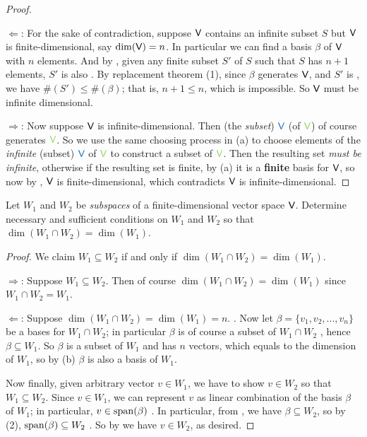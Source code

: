 \begin{proof} \ 

\(\Longleftarrow\): For the sake of contradiction, suppose \(\textsf{V}\) contains an infinite \LID{} subset \(S\) but \(\textsf{V}\) is finite-dimensional, say \(\dim(\textsf{V}) = n\).
In particular we can find a basis \(\beta\) of \(\textsf{V}\) with \(n\) elements.
And by , given any finite subset \(S'\) of \(S\) such that \(S\) has \(n + 1\) elements, \(S'\) is also \LID{}.
By replacement theorem (1), since \(\beta\) generates \(\textsf{V}\), and \(S'\) is \LID{}, we have \(\#(S') \le \#(\beta)\);
that is, \(n + 1 \le n\), which is impossible.
So \(\textsf{V}\) must be infinite dimensional.

\(\Longrightarrow\):
Now suppose \(\textsf{V}\) is infinite-dimensional.
Then (the \emph{subset}) \(\BLUE{\V}\) (of \(\GREEN{\V}\)) of course generates \(\GREEN{\V}\).
So we use the same choosing process in (a) to choose elements of the \emph{infinite} (subset) \(\BLUE{\V}\) of \(\GREEN{\V}\) to construct a \LID{} subset of \(\GREEN{\V}\).
Then the resulting set \emph{must be infinite}, otherwise if the resulting set is finite, by (a) it is a \textbf{finite} basis for \(\textsf{V}\), so now by , \(\textsf{V}\) is finite-dimensional, which contradicts \(\textsf{V}\) is infinite-dimensional.
\end{proof}

\begin{exercise} \label{exercise 1.6.22}
Let \(W_1\) and \(W_2\) be \emph{subspaces} of a finite-dimensional vector space \(\textsf{V}\).
Determine necessary and sufficient conditions on \(W_1\) and \(W_2\) so that \(\dim(W_1 \cap W_2) = \dim(W_1)\).
\end{exercise}

\begin{proof}
We claim \(W_1 \subseteq W_2\) if and only if \(\dim(W_1 \cap W_2) = \dim(W_1)\).

\(\Longrightarrow\): Suppose \(W_1 \subseteq W_2\).
Then of course \(\dim(W_1 \cap W_2) = \dim(W_1)\) since \(W_1 \cap W_2 = W_1\).

\(\Longleftarrow\):
Suppose \(\dim(W_1 \cap W_2) = \dim(W_1) = n\). .
Now let \(\beta = \{ v_1, v_2, ..., v_n \}\) be a bases for \(W_1 \cap W_2\); in particular \(\beta\) is of course a subset of \(W_1 \cap W_2\) , hence \(\beta \subseteq W_1\).
So \(\beta\) is a \LID{} subset of \(W_1\) and has \(n\) vectors, which equals to the dimension of \(W_1\), so by (b) \(\beta\) is also a basis of \(W_1\).

Now finally, given arbitrary vector \(v \in W_1\), we have to show \(v \in W_2\) so that \(W_1 \subseteq W_2\).
Since \(v \in W_1\), we can represent \(v\) as linear combination of the basis \(\beta\) of \(W_1\); in particular, \(v \in \operatorname{span}(\beta)\) .
In particular, from , we have \(\beta \subseteq W_2\), so by (2), \(\operatorname{span}(\beta) \subseteq W_2\) .
So by  we have \(v \in W_2\), as desired.
\end{proof}


